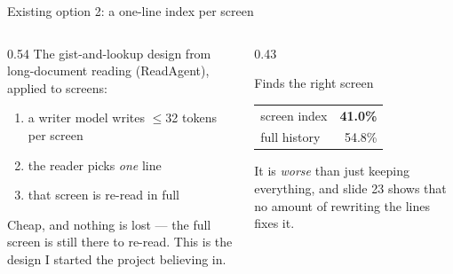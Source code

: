 \documentclass[aspectratio=169,10pt]{beamer}
\newcommand{\gr}[1]{{\color{ncgray}#1}}
\begin{document}
\begin{frame}{Existing option 2: a one-line index per screen}
\vspace{0.3cm}
\begin{columns}[T]
\begin{column}{0.54\textwidth}
The gist-and-lookup design from long-document reading (ReadAgent), applied to screens:
\begin{enumerate}\setlength\itemsep{0.25em}
\item a writer model writes $\le$32 tokens per screen
\item the reader picks \emph{one} line
\item that screen is re-read in full
\end{enumerate}
\vspace{0.6em}
Cheap, and nothing is lost --- the full screen is still there to re-read.
\vspace{0.5em}
\gr{This is the design I started the project believing in.}
\end{column}
\begin{column}{0.43\textwidth}
\begin{block}{Finds the right screen}
\begin{tabular}{lr}
screen index & {\color{wolfred}\textbf{41.0\%}}\\
full history & 54.8\%\\
\end{tabular}
\end{block}
\vspace{0.4em}
It is \emph{worse} than just keeping everything, and slide 23 shows that no amount of rewriting the lines fixes it.
\end{column}
\end{columns}
\end{frame}
\end{document}
